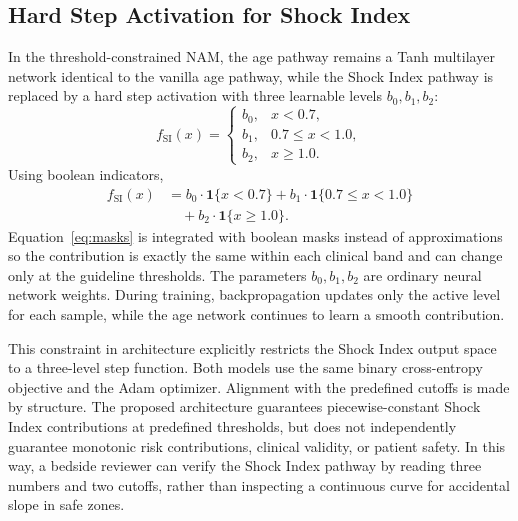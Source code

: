 \documentclass[conference]{IEEEtran}
\begin{document}
\subsection{Hard Step Activation for Shock Index}
In the threshold-constrained NAM, the age pathway remains a Tanh multilayer network identical to the vanilla age pathway, while the Shock Index pathway is replaced by a hard step activation with three learnable levels $b_0,b_1,b_2$:
\begin{equation}
f_{\mathrm{SI}}(x)=
\begin{cases}
b_0, & x<0.7,\\
b_1, & 0.7\le x<1.0,\\
b_2, & x\ge 1.0.
\end{cases}
\label{eq:step}
\end{equation}
Using boolean indicators,
\begin{equation}
\begin{aligned}
f_{\mathrm{SI}}(x)
&= b_0\cdot\mathbf{1}\{x<0.7\} + b_1\cdot\mathbf{1}\{0.7\le x<1.0\}\\
&\quad + b_2\cdot\mathbf{1}\{x\ge 1.0\}.
\end{aligned}
\label{eq:masks}
\end{equation}
Equation~\eqref{eq:masks} is integrated with boolean masks instead of approximations so the contribution is exactly the same within each clinical band and can change only at the guideline thresholds. The parameters $b_0,b_1,b_2$ are ordinary neural network weights. During training, backpropagation updates only the active level for each sample, while the age network continues to learn a smooth contribution.

This constraint in architecture explicitly restricts the Shock Index output space to a three-level step function. Both models use the same binary cross-entropy objective and the Adam optimizer. Alignment with the predefined cutoffs is made by structure. The proposed architecture guarantees piecewise-constant Shock Index contributions at predefined thresholds, but does not independently guarantee monotonic risk contributions, clinical validity, or patient safety. In this way, a bedside reviewer can verify the Shock Index pathway by reading three numbers and two cutoffs, rather than inspecting a continuous curve for accidental slope in safe zones.
\end{document}
